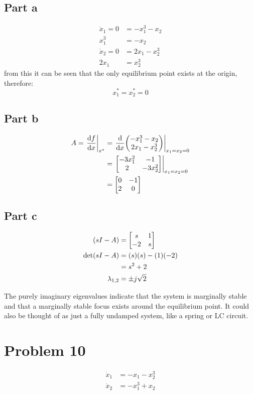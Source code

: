 \documentclass[]{article}
\begin{document}
\subsection{Part a}
\begin{align*}
	\dot{x}_1 = 0 &= -x_1^3 -x_2\\
	x_1^3 &= -x_2\\
	\dot{x}_2 = 0 &= 2x_1 -x_2^3\\
	2 x_1 &= x_2^3
\end{align*}
from this it can be seen that the only equilibrium point exists at the origin, therefore:
\begin{displaymath}
	x_1^* = x_2^* = 0
\end{displaymath}

\subsection{Part b}
\begin{align*}
	A = \eval{\dv{f}{x}}_{x^*} &= \eval{\dv{x} \mqty(-x_1^3 -x_2\\ 2x_1 -x_2^3)}_{x_1=x_2=0}\\
	&= \eval{\mqty[-3x_1^2 & -1\\ 2& -3x_2^2]}_{x_1=x_2=0}\\
	&= \mqty[0&-1\\ 2 & 0]
\end{align*}

\subsection{Part c}
\begin{align*}
	(sI - A)
	&= \mqty[s & 1\\ -2 & s]\\
	\det(sI-A)
	&= (s)(s) - (1)(-2)\\
	&= s^2 + 2\\
	\lambda_{1,2}
	&= \pm j \sqrt{2}
\end{align*}

The purely imaginary eigenvalues indicate that the system is marginally stable and that a marginally stable focus exists around the equilibrium point. It could also be thought of as just a fully undamped system, like a spring or LC circuit.

\newpage
\section{Problem 10}
\begin{align*}
	\dot{x}_1 &= -x_1 -x_2^3\\
	\dot{x}_2 &= -x_1^3 + x_2
\end{align*}
\end{document}
